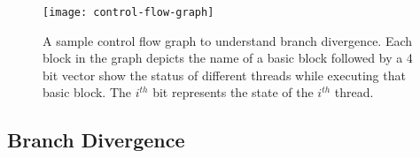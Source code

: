 %
%

\begin{figure}
	\centering
	\texttt{[image: control-flow-graph]}
	\caption{A sample control flow graph to understand branch divergence. Each block in the graph depicts the name of a basic block followed by a 4 bit vector show the status of different threads while executing that basic block. The $i^{th}$ bit represents the state of the $i^{th}$ thread.
	\label{fig:control-flow-graph}} 
\end{figure}

\subsection*{Branch Divergence}
\label{sec:branch-divergence-description}
